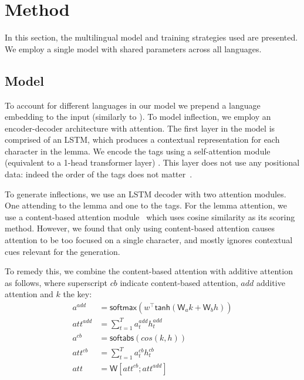 \documentclass[11pt,a4paper]{article}
\newcommand\jp[1]{\textbf{JP: #1}}
\begin{document}


\section{Method}

In this section, the multilingual model and training strategies used
are presented. We employ a single model with shared parameters
across all languages. 

\subsection{Model}
To account for different languages in our model we prepend a language
embedding to the input (similarly to ).  To model inflection, we employ an
encoder-decoder architecture with attention. The first layer in the
model is comprised of an LSTM, which produces a contextual
representation for each character in the lemma.  We encode the tags
using a self-attention module (equivalent to a 1-head transformer
layer) \cite{DBLP:conf/nips/VaswaniSPUJGKP17}.  This layer does not
use any positional data: indeed the order of the tags does not matter~\cite{DBLP:conf/emnlp/AnastasopoulosN19}.

To generate inflections, we use an LSTM decoder with two attention
modules. One attending to the lemma and one to the tags. For the lemma
attention, we use a content-based attention module~\cite{graves2014neural, karunaratne2021robust} which uses cosine
similarity as its scoring method.  However, we found that only using
content-based attention causes attention to be too focused on a
single character, and mostly ignores contextual cues relevant for the
generation.

To remedy this, we combine the content-based attention with additive
attention as follows, where superscript $cb$ indicate content-based attention,
$add$ additive attention and $k$ the key:
%
\begin{align*}
	a^{add} & = \mathsf{softmax}(w^\top\mathsf{tanh}(\mathsf{W}_ak + \mathsf{W}_bh))\\
	att^{add} & = \sum_{t=1}^{T}a_t^{add}h_t^{add}\\
	a^{cb} & = \mathsf{softabs}(cos(k,h))\\
	att^{cb} & = \sum_{t=1}^{T}a_t^{cb}h_t^{cb}\\
	att & = \mathsf{W}[att^{cb}; att^{add}]
\end{align*}
\end{document}
